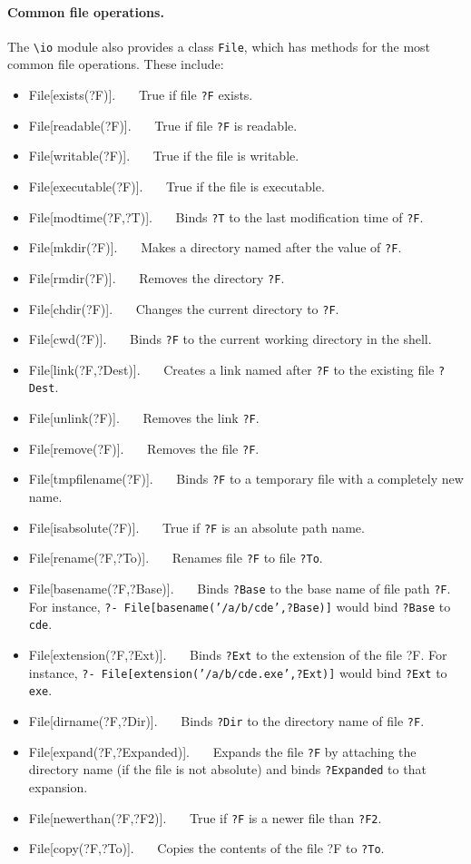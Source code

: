 \documentclass[11pt]{article}
\newcommand{\bs}{\textbackslash}
\begin{document}
\paragraph{Common file operations.}
The {\tt \bs{}io} module also provides a class {\tt File}, which has methods
for the most common file operations. These include:
\begin{itemize}
\item  File[exists(?F)].~~~
  True if file {\tt ?F} exists. 
\item File[readable(?F)].~~~
  True if file {\tt ?F} is readable. 
\item File[writable(?F)].~~~
  True if the file is writable.
\item File[executable(?F)].~~~
  True if the file is executable.
\item File[modtime(?F,?T)].~~~
  Binds {\tt ?T} to the last modification time of {\tt ?F}.  
\item File[mkdir(?F)].~~~
  Makes a directory named after the value of {\tt ?F}. 
\item File[rmdir(?F)].~~~
  Removes the directory {\tt ?F}. 
\item File[chdir(?F)].~~~
  Changes the current directory to {\tt ?F}. 
\item File[cwd(?F)].~~~
  Binds {\tt ?F} to the current working directory in the shell. 
\item File[link(?F,?Dest)].~~~
  Creates a link named after {\tt ?F} to the existing file {\tt ?Dest}.  
\item File[unlink(?F)].~~~
  Removes the link {\tt ?F}. 
\item File[remove(?F)].~~~
  Removes the file {\tt ?F}. 
\item File[tmpfilename(?F)].~~~
  Binds {\tt ?F} to a temporary file with a completely new name. 
\item File[isabsolute(?F)].~~~
  True if {\tt ?F} is an absolute path name. 
\item File[rename(?F,?To)].~~~
  Renames file {\tt ?F} to file {\tt ?To}.  
\item File[basename(?F,?Base)].~~~
  Binds {\tt ?Base} to the base name of file path {\tt ?F}. For instance, 
  {\tt ?- File[basename('/a/b/cde',?Base)]} would bind {\tt ?Base} to {\tt
    cde}.  
\item File[extension(?F,?Ext)].~~~
  Binds {\tt ?Ext} to the extension of the file ?F. For instance, 
  {\tt ?- File[extension('/a/b/cde.exe',?Ext)]} would bind {\tt ?Ext} to {\tt
    exe}.  
\item File[dirname(?F,?Dir)].~~~
  Binds {\tt ?Dir} to the directory name of file {\tt ?F}.  
\item File[expand(?F,?Expanded)].~~~
  Expands the file {\tt ?F} by attaching the directory name (if the file is
  not absolute) and binds {\tt ?Expanded} to that expansion.  
\item File[newerthan(?F,?F2)].~~~
  True if {\tt ?F} is a newer file than {\tt ?F2}. 
\item File[copy(?F,?To)].~~~
  Copies the contents of the file ?F to {\tt ?To}. 
\end{itemize}
\end{document}
